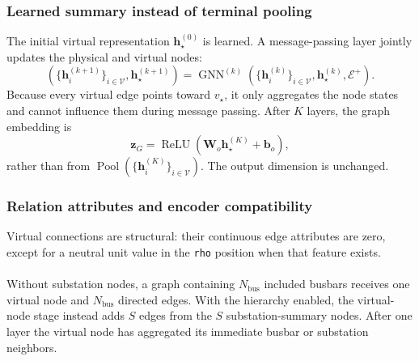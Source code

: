 \subsubsection{Learned summary instead of terminal pooling}
\label{subsec:virtual-node-summary}

The initial virtual representation $\mathbf{h}_{\star}^{(0)}$ is learned. A
message-passing layer jointly updates the physical and virtual nodes:
\begin{equation}
  \left(
    \{\mathbf{h}_{i}^{(k+1)}\}_{i\in\mathcal{V}},
    \mathbf{h}_{\star}^{(k+1)}
  \right)
  =
  \operatorname{GNN}^{(k)}
  \left(
    \{\mathbf{h}_{i}^{(k)}\}_{i\in\mathcal{V}},
    \mathbf{h}_{\star}^{(k)},
    \mathcal{E}^{+}
  \right).
  \label{eq:virtual-node-update}
\end{equation}
Because every virtual edge points toward $v_{\star}$, it only aggregates the
node states and cannot influence them during message passing. After $K$ layers,
the graph embedding is
\begin{equation}
  \mathbf{z}_{G}
  = \operatorname{ReLU}
    \left(\mathbf{W}_{o}\mathbf{h}_{\star}^{(K)}+\mathbf{b}_{o}\right),
  \label{eq:virtual-node-readout}
\end{equation}
rather than from
$\operatorname{Pool}(\{\mathbf{h}_{i}^{(K)}\}_{i\in\mathcal{V}})$. The output
dimension is unchanged.

\subsubsection{Relation attributes and encoder compatibility}
\label{subsec:virtual-node-compatibility}

Virtual connections are structural: their continuous edge attributes are zero,
except for a neutral unit value in the
\texttt{rho} position when that feature exists.
\\
\\
Without substation nodes, a graph containing $N_{\mathrm{bus}}$ included
busbars receives one virtual node and $N_{\mathrm{bus}}$ directed edges. With
the hierarchy enabled, the virtual-node stage instead adds $S$ edges from the
$S$ substation-summary nodes. After one layer the virtual node has aggregated
its immediate busbar or substation neighbors.

